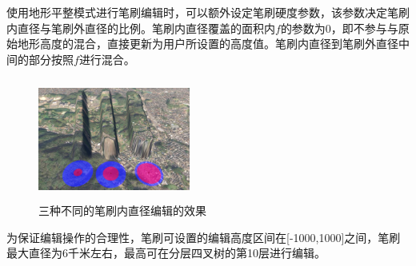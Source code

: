 使用地形平整模式进行笔刷编辑时，可以额外设定笔刷硬度参数，该参数决定笔刷内直径与笔刷外直径的比例。笔刷内直径覆盖的面积内$f$的参数为0，即不参与与原始地形高度的混合，直接更新为用户所设置的高度值。笔刷内直径到笔刷外直径中间的部分按照$f$进行混合。\par
\begin{figure}[ht]
\centering
\includegraphics[height=4cm        ,width=5cm]{figures/flatten2.jpg}
\caption{三种不同的笔刷内直径编辑的效果}
\end{figure}
为保证编辑操作的合理性，笔刷可设置的编辑高度区间在[-1000,1000]之间，笔刷最大直径为6千米左右，最高可在分层四叉树的第10层进行编辑。
